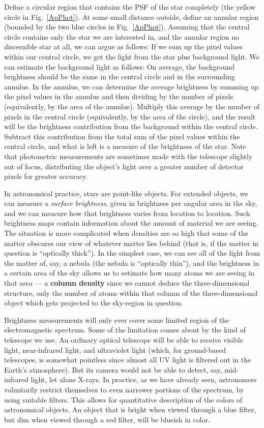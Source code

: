 \documentclass[twocolumn,apj]{openjournal}
\begin{document}
Define a circular region that contains the PSF of the star completely (the yellow circle in Fig.~\ref{ApPhot}). At some small distance outside, define an annular region (bounded by the two blue circles in Fig.~\ref{ApPhot}). Assuming that the central circle contains only the star we are interested in, and the annular region no discernible star at all, we can argue as follows: If we sum up the pixel values within our central circle, we get the light from the star plus background light. We can estimate the background light as follows: On average, the background brightness should be the same in the central circle and in the surrounding annulus. In the annulus, we can determine the average brightness by summing up the pixel values in the annulus and then dividing by the number of pixels (equivalently, by the area of the annulus). Multiply this average by the number of pixels in the central circle (equivalently, by the area of the circle), and the result will be the brightness contribution from the background within the central circle. Subtract this contribution from the total sum of the pixel values within the central circle, and what is left is a measure of the brightness of the star. Note that photometric measurements are sometimes made with the telescope slightly out of focus, distributing the object's light over a greater number of detector pixels for greater accuracy.

In astronomical practice, stars are point-like objects. For extended objects, we can measure a {\em surface brightness}, given in brightness per angular area in the sky, and we can measure how that brightness varies from location to location. Such brightness maps contain information about the amount of material we are seeing. The situation is more complicated when densities are so high that some of the matter obscures our view of whatever matter lies behind (that is, if the matter in question is ``optically thick''). In the simplest case, we can see all of the light from the matter of, say, a nebula (the nebula is ``optically thin''), and the brightness in a certain area of the sky allows us to estimate how many atoms we are seeing in that area --- a {\bf column density} since we cannot deduce the three-dimensional structure, only the number of atoms within that column of the three-dimensional object which gets projected to the sky-region in question.

Brightness measurements will only ever cover some limited region of the electromagnetic spectrum. Some of the limitation comes about by the kind of telescope we use. An ordinary optical telescope will be able to receive visible light, near-infrared light, and ultraviolet light (which, for ground-based telescopes, is somewhat pointless since almost all UV light is filtered out in the Earth's atmosphere). But its camera would not be able to detect, say, mid-infrared light, let alone X-rays. In practice, as we have already seen, astronomers voluntarily restrict themselves to even narrower portions of the spectrum, by using suitable filters. This allows for quantitative description of the colors of astronomical objects. An object that is bright when viewed through a blue filter, but dim when viewed through a red filter, will be blueish in color. 
\end{document}
